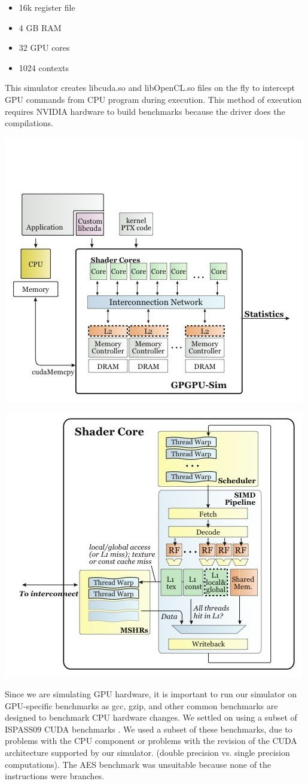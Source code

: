 \documentclass[conference]{IEEEtran}
\begin{document}
\begin{itemize}
	\item 16k register file
	\item 4 GB RAM
	\item 32 GPU cores
	\item 1024 contexts
\end{itemize}

This simulator creates libcuda.so and libOpenCL.so files on the fly to intercept GPU commands from CPU program during execution.  This method of execution requires NVIDIA hardware to build benchmarks because the driver does the compilations.

\begin{center}
	\includegraphics[width=.45\textwidth]{uarch1.jpg}
\end{center}

\begin{center}
	\includegraphics[width=.45\textwidth]{uarch2.jpg}
\end{center}

Since we are simulating GPU hardware, it is important to run our simulator on GPU-specific benchmarks as gcc, gzip, and other common benchmarks are designed to benchmark CPU hardware changes.  We settled on using a subset of ISPASS09 CUDA benchmarks \cite{ispass09}.  We used a subset of these benchmarks, due to problems with the CPU component or problems with the revision of the CUDA architecture supported by our simulator. (double precision vs. single precision computations).  The AES benchmark was unsuitable because none of the instructions were branches.
\end{document}
